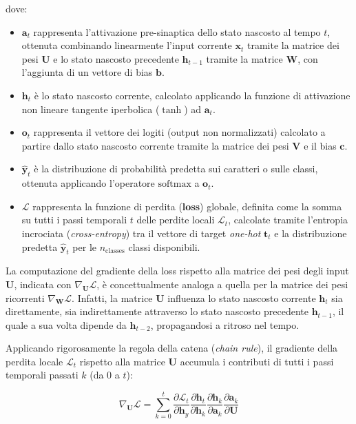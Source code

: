 ﻿\documentclass[11pt, a4paper]{article}
\begin{document}
dove:
\begin{itemize}[noitemsep]
    \item $\bm{a}_t$ rappresenta l'attivazione pre-sinaptica dello stato nascosto al tempo $t$, ottenuta combinando linearmente l'input corrente $\bm{x}_t$ tramite la matrice dei pesi $\bm{U}$ e lo stato nascosto precedente $\bm{h}_{t-1}$ tramite la matrice $\bm{W}$, con l'aggiunta di un vettore di bias $\bm{b}$.
    \item $\bm{h}_t$ è lo stato nascosto corrente, calcolato applicando la funzione di attivazione non lineare tangente iperbolica ($\tanh$) ad $\bm{a}_t$.
    \item $\bm{o}_t$ rappresenta il vettore dei logiti (output non normalizzati) calcolato a partire dallo stato nascosto corrente tramite la matrice dei pesi $\bm{V}$ e il bias $\bm{c}$.
    \item $\hat{\bm{y}}_t$ è la distribuzione di probabilità predetta sui caratteri o sulle classi, ottenuta applicando l'operatore $\text{softmax}$ a $\bm{o}_t$.
    \item $\mathcal{L}$ rappresenta la funzione di perdita (\textbf{loss}) globale, definita come la somma su tutti i passi temporali $t$ delle perdite locali $\mathcal{L}_t$, calcolate tramite l'entropia incrociata (\emph{cross-entropy}) tra il vettore di target \emph{one-hot} $\bm{t}_{t}$ e la distribuzione predetta $\hat{\bm{y}}_t$ per le $n_{\text{classes}}$ classi disponibili.
\end{itemize}

La computazione del gradiente della loss rispetto alla matrice dei pesi degli input $\bm{U}$, indicata con $\nabla_{\bm{U}}\mathcal{L}$, è concettualmente analoga a quella per la matrice dei pesi ricorrenti $\nabla_{\bm{W}}\mathcal{L}$. Infatti, la matrice $\bm{U}$ influenza lo stato nascosto corrente $\bm{h}_t$ sia direttamente, sia indirettamente attraverso lo stato nascosto precedente $\bm{h}_{t-1}$, il quale a sua volta dipende da $\bm{h}_{t-2}$, propagandosi a ritroso nel tempo.

Applicando rigorosamente la regola della catena (\emph{chain rule}), il gradiente della perdita locale $\mathcal{L}_t$ rispetto alla matrice $\bm{U}$ accumula i contributi di tutti i passi temporali passati $k$ (da $0$ a $t$):

\begin{equation}
\boxed{\nabla_{\bm{U}} \mathcal{L} = \sum_{k=0}^t \frac{\partial \mathcal{L}_t}{\partial \bm{h}_y} \frac{\partial \bm{h}_t}{\partial \bm{h}_k} \frac{\partial \bm{h}_k}{\partial \bm{a}_k} \frac{\partial \bm{a}_k}{\partial \bm{U}}}
\end{equation}
\end{document}
